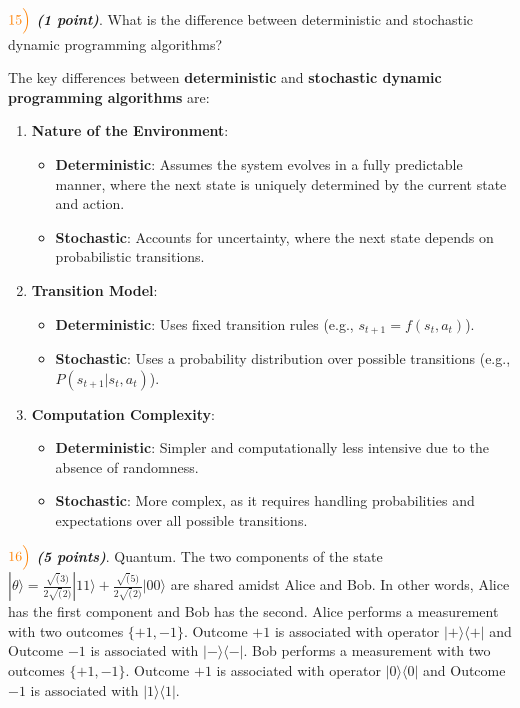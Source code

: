 \documentclass[11pt]{article}
\providecommand{\tightlist}{%
      \setlength{\itemsep}{0pt}\setlength{\parskip}{0pt}}
\begin{document}
    \(\color{orange}15\Bigl)\) \textbf{\emph{(1 point)}}. What is the
difference between deterministic and stochastic dynamic programming
algorithms?

    The key differences between \textbf{deterministic} and
\textbf{stochastic dynamic programming algorithms} are:

\begin{enumerate}
\def\labelenumi{\arabic{enumi}.}
\tightlist
\item
  \textbf{Nature of the Environment}:

  \begin{itemize}
  \tightlist
  \item
    \textbf{Deterministic}: Assumes the system evolves in a fully
    predictable manner, where the next state is uniquely determined by
    the current state and action.
  \item
    \textbf{Stochastic}: Accounts for uncertainty, where the next state
    depends on probabilistic transitions.
  \end{itemize}
\item
  \textbf{Transition Model}:

  \begin{itemize}
  \tightlist
  \item
    \textbf{Deterministic}: Uses fixed transition rules (e.g.,
    \(s_{t+1} = f(s_t, a_t)\)).
  \item
    \textbf{Stochastic}: Uses a probability distribution over possible
    transitions (e.g., \(P(s_{t+1} | s_t, a_t)\)).
  \end{itemize}
\item
  \textbf{Computation Complexity}:

  \begin{itemize}
  \tightlist
  \item
    \textbf{Deterministic}: Simpler and computationally less intensive
    due to the absence of randomness.
  \item
    \textbf{Stochastic}: More complex, as it requires handling
    probabilities and expectations over all possible transitions.
  \end{itemize}
\end{enumerate}

    \(\color{orange}16\Bigl)\) \textbf{\emph{(5 points)}}. Quantum. The two
components of the state
\(|\theta⟩= \frac{\sqrt(3)}{2\sqrt(2)}|11⟩+ \frac{\sqrt(5)}{2\sqrt(2)}|00⟩\)
are shared amidst Alice and Bob. In other words, Alice has the first
component and Bob has the second. Alice performs a measurement with two
outcomes \(\{{+1,−1}\}\). Outcome \(+1\) is associated with operator
\(|+⟩⟨+|\) and Outcome \(−1\) is associated with \(|−⟩⟨−|\). Bob
performs a measurement with two outcomes \(\{{+1,−1}\}\). Outcome \(+1\)
is associated with operator \(|0⟩⟨0|\) and Outcome \(−1\) is associated
with \(|1⟩⟨1|\).
\end{document}

